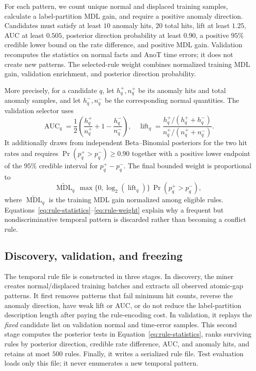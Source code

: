 For each pattern, we count unique normal and displaced training samples, calculate a label-partition MDL gain, and require a positive anomaly direction. Candidates must satisfy at least $10$ anomaly hits, $20$ total hits, lift at least $1.25$, AUC at least $0.505$, posterior direction probability at least $0.90$, a positive $95\%$ credible lower bound on the rate difference, and positive MDL gain. Validation recomputes the statistics on normal facts and AnoT time errors; it does not create new patterns. The selected-rule weight combines normalized training MDL gain, validation enrichment, and posterior direction probability.

More precisely, for a candidate $q$, let $h^+_q,n^+_q$ be its anomaly hits and total anomaly samples, and let $h^-_q,n^-_q$ be the corresponding normal quantities. The validation selector uses
\begin{equation}
\operatorname{AUC}_q=\frac{1}{2}\left(\frac{h^+_q}{n^+_q}+1-\frac{h^-_q}{n^-_q}\right),
\quad
\operatorname{lift}_q=
\frac{h^+_q/(h^+_q+h^-_q)}{n^+_q/(n^+_q+n^-_q)}.
\label{eq:rule-statistics}
\end{equation}
It additionally draws from independent Beta--Binomial posteriors for the two hit rates and requires $\Pr(p_q^+>p_q^-)\geq0.90$ together with a positive lower endpoint of the $95\%$ credible interval for $p_q^+-p_q^-$. The final bounded weight is proportional to
\begin{equation}
\widetilde{\operatorname{MDL}}_q\,\max\{0,\log_2(\operatorname{lift}_q)\}\,
\Pr(p_q^+>p_q^-),
\label{eq:rule-weight}
\end{equation}
where $\widetilde{\operatorname{MDL}}_q$ is the training MDL gain normalized among eligible rules. Equations~\ref{eq:rule-statistics}--\ref{eq:rule-weight} explain why a frequent but nondiscriminative temporal pattern is discarded rather than becoming a conflict rule.

\subsection{Discovery, validation, and freezing}

The temporal rule file is constructed in three stages. In discovery, the miner creates normal/displaced training batches and extracts all observed atomic-gap patterns. It first removes patterns that fail minimum hit counts, reverse the anomaly direction, have weak lift or AUC, or do not reduce the label-partition description length after paying the rule-encoding cost. In validation, it replays the \emph{fixed} candidate list on validation normal and time-error samples. This second stage computes the posterior tests in Equation~\ref{eq:rule-statistics}, ranks surviving rules by posterior direction, credible rate difference, AUC, and anomaly hits, and retains at most $500$ rules. Finally, it writes a serialized rule file. Test evaluation loads only this file; it never enumerates a new temporal pattern.

